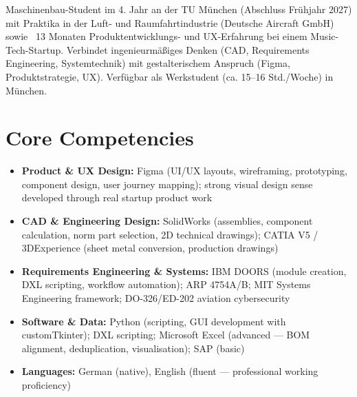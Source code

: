 \documentclass[11pt,a4paper,sans]{moderncv}
\begin{document}
\makecvtitle


\vspace{6pt}
\small{Maschinenbau-Student im 4. Jahr an der TU München (Abschluss Frühjahr 2027) mit Praktika in der Luft- und Raumfahrtindustrie (Deutsche Aircraft GmbH) sowie ~13 Monaten Produktentwicklungs- und UX-Erfahrung bei einem Music-Tech-Startup. Verbindet ingenieurmäßiges Denken (CAD, Requirements Engineering, Systemtechnik) mit gestalterischem Anspruch (Figma, Produktstrategie, UX). Verfügbar als Werkstudent (ca. 15–16 Std./Woche) in München.}


\section{Core Competencies}
\vspace{1pt}
\begin{itemize}

\item \textbf{Product \& UX Design:} Figma (UI/UX layouts, wireframing, prototyping, component design, user journey mapping); strong visual design sense developed through real startup product work

\item \textbf{CAD \& Engineering Design:} SolidWorks (assemblies, component calculation, norm part selection, 2D technical drawings); CATIA V5 / 3DExperience (sheet metal conversion, production drawings)

\item \textbf{Requirements Engineering \& Systems:} IBM DOORS (module creation, DXL scripting, workflow automation); ARP 4754A/B; MIT Systems Engineering framework; DO-326/ED-202 aviation cybersecurity

\item \textbf{Software \& Data:} Python (scripting, GUI development with customTkinter); DXL scripting; Microsoft Excel (advanced — BOM alignment, deduplication, visualisation); SAP (basic)

\item \textbf{Languages:} German (native), English (fluent — professional working proficiency)

\end{itemize}
\end{document}
